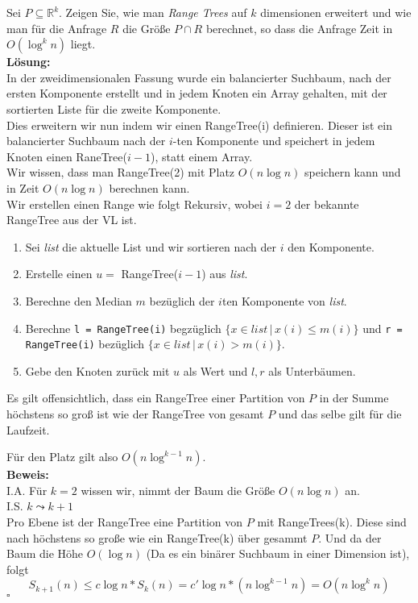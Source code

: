 \documentclass[11pt,a4paper,ngerman]{article}
\begin{document}
Sei $P \subseteq \mathbb{R}^k$. Zeigen Sie, wie man \emph{Range Trees} auf $k$ dimensionen erweitert und wie man
für die Anfrage $R$ die Größe $P \cap R$ berechnet, so dass die Anfrage Zeit in $O(\log^k n)$ liegt.\\

\textbf{Lösung:}\\

In der zweidimensionalen Fassung wurde ein balancierter Suchbaum, nach der ersten Komponente erstellt und
in jedem Knoten ein Array gehalten, mit der sortierten Liste für die zweite Komponente.\\

Dies erweitern wir nun indem wir einen RangeTree(i) definieren. Dieser
ist ein balancierter Suchbaum nach der $i$-ten Komponente und speichert in jedem Knoten einen
RaneTree($i-1$), statt einem Array.\\

Wir wissen, dass man RangeTree(2) mit Platz $O(n \log n)$ speichern kann und in Zeit $O(n \log n)$ berechnen kann.\\

Wir erstellen einen Range wie folgt Rekursiv, wobei $i=2$ der bekannte RangeTree aus der VL ist.
\begin{enumerate}[1.]
    \item Sei \emph{list} die aktuelle List und wir sortieren nach der $i$ den Komponente.
    \item Erstelle einen $u = $ RangeTree($i-1$) aus \emph{list}.
    \item Berechne den Median $m$ bezüglich der $i$ten Komponente von \emph{list}.
    \item Berechne \lstinline|l = RangeTree(i)| begzüglich $\{ x \in list \, | \, x(i) \leq m(i) \}$
        und \lstinline|r = RangeTree(i)| bezüglich $\{x \in list \, | \, x(i) > m(i) \}$.
    \item Gebe den Knoten zurück mit $u$ als Wert und $l,r$ als Unterbäumen.
\end{enumerate}

Es gilt offensichtlich, dass ein RangeTree einer Partition von $P$ in der Summe höchstens so groß ist
wie der RangeTree von gesamt $P$ und das selbe gilt für die Laufzeit.

Für den Platz gilt also $O(n \log^{k-1} n)$.\\
\textbf{Beweis:}\\
I.A. Für $k=2$ wissen wir, nimmt der Baum die Größe $O(n \log n)$ an.\\
I.S. $k \leadsto k+1$\\
    Pro Ebene ist der RangeTree eine Partition von $P$ mit RangeTrees(k). Diese
    sind nach höchstens so große wie ein RangeTree(k) über gesammt $P$.
    Und da der Baum die Höhe $O(\log n)$ (Da es ein binärer Suchbaum in einer Dimension ist),
    folgt
    $$
        S_{k+1}(n) \leq c \log n * S_{k}(n) = c' \log n * (n \log^{k-1} n) = O(n \log^k n)
    $$
\mbox{}\hfill$\square$
\end{document}
